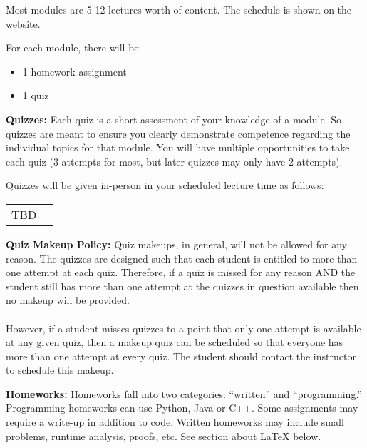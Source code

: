 \documentclass[12pt]{article}
\begin{document}
Most modules are 5-12 lectures worth of content. The schedule is shown on the website. 

For each module, there will be:
\begin{itemize}
    \item 1 homework assignment
    \item 1 quiz
\end{itemize}

\textbf{Quizzes:}  Each quiz is a short assessment of your knowledge of a module. So quizzes are meant to ensure you clearly demonstrate competence regarding the individual topics for that module.  You will have multiple opportunities to take each quiz (3 attempts for most, but later quizzes may only have 2 attempts).

Quizzes will be given in-person in your scheduled lecture time as follows:\\

\begin{tabular}{ll}
TBD
\end{tabular}

\textbf{Quiz Makeup Policy:} Quiz makeups, in general, will not be allowed for any reason. The quizzes are designed such that each student is entitled to more than one attempt at each quiz. Therefore, if a quiz is missed for any reason AND the student still has more than one attempt at the quizzes in question available then no makeup will be provided.\\
\\
However, if a student misses quizzes to a point that only one attempt is available at any given quiz, then a makeup quiz can be scheduled so that everyone has more than one attempt at every quiz. The student should contact the instructor to schedule this makeup. 

\textbf{Homeworks:} Homeworks fall into two categories:  ``written'' and ``programming.'' Programming homeworks can use Python, Java or C++. Some assignments may require a write-up in addition to code.  Written homeworks may include small problems, runtime analysis, proofs, etc.   See section about \LaTeX{} below.
\end{document}
